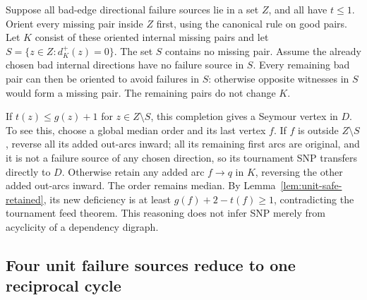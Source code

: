 Suppose all bad-edge directional failure sources lie in a set $Z$,
and all have $t\le1$.  Orient every missing pair inside $Z$ first,
using the canonical rule on good pairs.
Let $K$ consist of these oriented internal missing pairs and let
$S=\{z\in Z:d_K^+(z)=0\}$.
The set $S$ contains no missing pair.
Assume the already chosen bad internal directions have no failure
source in $S$.  Every remaining bad pair can then be oriented to
avoid failures in $S$: otherwise opposite witnesses in $S$ would
form a missing pair.  The remaining pairs do not change $K$.

If $t(z)\le g(z)+1$ for $z\in Z\setminus S$, this completion gives
a Seymour vertex in $D$.  To see this, choose a global median order
and its last vertex $f$.  If $f$ is outside $Z\setminus S$, reverse
all its added out-arcs inward; all its remaining first arcs are
original, and it is not a failure source of any chosen direction,
so its tournament SNP transfers directly to $D$.
Otherwise retain any added arc $f\to q$ in $K$, reversing the other
added out-arcs inward.  The order remains median.  By
Lemma~\ref{lem:unit-safe-retained}, its new deficiency is at least
$g(f)+2-t(f)\ge1$, contradicting the tournament feed theorem.
This reasoning does not infer SNP merely from acyclicity of a
dependency digraph.

\subsection{Four unit failure sources reduce to one reciprocal cycle}


